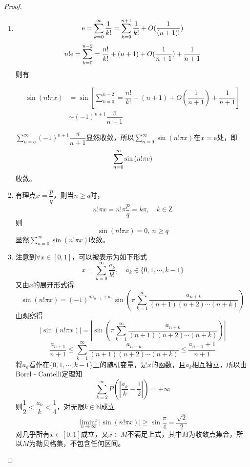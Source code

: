 \begin{proof}

    \begin{enumerate}

        \item 
            $$\mathrm{e} = \sum\limits_{k=0}^{\infty}{\dfrac{1}{k!}} = \sum\limits_{k=0}^{n+1}{\dfrac{1}{k!}} + O(\dfrac{1}{(n+1)!})$$
            $$n! \mathrm{e} = \sum\limits_{k=0}^{n-2} = \dfrac{n!}{k!} + (n+1) + O(\dfrac{1}{n + 1}) + \dfrac{1}{n + 1}$$
            则有

            \begin{align*}
                \sin{(n!\pi x)} & = \sin{\left[\sum\limits_{k=0}^{n-2} = \dfrac{n!}{k!} + (n+1) + O(\dfrac{1}{n + 1}) + \dfrac{1}{n + 1}\right]} \\
                & \sim (-1)^{n+1} \dfrac{\pi}{n+1}
            \end{align*}
            
            $\sum\limits_{n=o}^{\infty}{(-1)^{n+1} \dfrac{\pi}{n+1}}$显然收敛，所以$\sum\limits_{n=0}^{\infty}{\sin{(n!\pi x)}}$在$x= \mathrm{e}$处，即
            $$\sum\limits_{n=0}^{\infty}{\sin{(n!\pi \mathrm{e})}}$$
            收敛。
        
        \item 
            有理点$x = \dfrac{p}{q}$，则当$n \geq q$时，
            $$n!\pi x = n! \pi \dfrac{p}{q} = k\pi,\quad k \in \mathrm{Z}$$
            则
            $$\sin{(n!\pi x)} = 0, \ n \geq q$$
            显然$\sum\limits_{n=0}^{\infty}{\sin{(n!\pi x)}}$收敛。

        \item 注意到$\forall x \in [0,1]$，可以被表示为如下形式
            $$x = \sum\limits_{k=0}^{\infty}{\dfrac{a_k}{k!}}, \quad a_k \in \{0, 1, \cdots, k-1\}$$
            又由$x$的展开形式得
            $$\sin{(n!\pi x)} = (-1)^{na_{n-1} + a_n} \sin{\left(\pi \sum\limits_{k=1}^{\infty}{\dfrac{a_{n+k}}{(n+1)(n+2) \cdots(n+k)}}\right)}$$
            由观察得
            $$ |\sin{(n!\pi x)}| = \left| \sin{\left(\pi \sum\limits_{k=1}^{\infty}{\dfrac{a_{n+k}}{(n+1)(n+2) \cdots(n+k)}}\right)} \right|$$
            $$\dfrac{a_{n+1}}{n+1} \leq \sum\limits_{k=1}^{\infty}{\dfrac{a_{n+k}}{(n+1)(n+2) \cdots (n+k)}} \leq \dfrac{a_{n+1} + 1}{n+1} $$
            将$a_k$看作在$\{0, 1, \cdots, k-1\}$上的随机变量，是$x$的函数，且$a_k$相互独立，所以由\textup{Borel - Cantelli}定理知
            $$\sum\limits_{k=2}^{\infty}{P \left(\left| \dfrac{a_k}{k} - \dfrac{1}{2} \right| \right)} = +\infty$$
            则$\dfrac{1}{2} < \dfrac{a_k}{k} < \dfrac{1}{4}$，对无限$k \in \mathbb{N}$成立
            $$\liminf_{n\to\infty}{|\sin{(n!\pi x)}|} \geq \sin{\dfrac{\pi}{4}} = \dfrac{\sqrt{2}}{2}$$
            对几乎所有$x \in [0,1]$成立，又$x \in M$不满足上式，其中$M$为收敛点集合，所以$M$为勒贝格集，不包含任何区间。

       \end{enumerate}

\end{proof}

